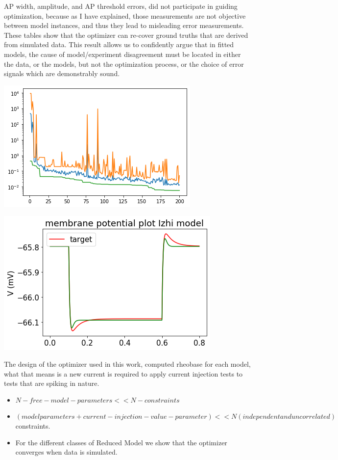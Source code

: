 AP width, amplitude, and AP threshold errors, did not participate in guiding optimization, because as I have explained, those measurements are not objective between model instances, and thus they lead to misleading error measurements. These tables show that the optimizer can re-cover ground truths that are derived from simulated data. This result allows us to confidently argue that in fitted models, the cause of model/experiment disagreement must be located in either the data, or the models, but not the optimization process, or the choice of error signals which are demonstrably sound.


\includegraphics[]{figures/simulated_convergence_performance.png}

\includegraphics[]{figures/simulated_data_convergence_passive_fits.png}





The design of the optimizer used in this work, computed rheobase for each model, what that means is a new current is required to apply current injection tests to tests that are spiking in nature.\\

\begin{itemize}
\item  $N-free-model-parameters << N-constraints$
\item  $(model parameters + current-injection-value-parameter) << N (independent and uncorrelated)$ constraints.
\item  For the different classes of Reduced Model we show that the optimizer converges when data is simulated.
\end{itemize}

